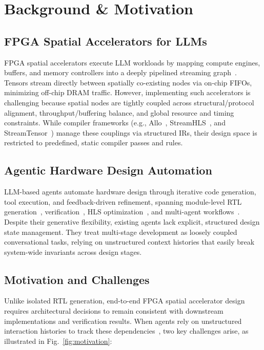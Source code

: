 \documentclass[9pt,conference]{IEEEtran}
\begin{document}
\section{Background \& Motivation}

\subsection{FPGA Spatial Accelerators for LLMs}
FPGA spatial accelerators execute LLM workloads by mapping compute engines, buffers, and memory controllers into a deeply pipelined streaming graph~\cite{streamtensor,allo,streamhls}. Tensors stream directly between spatially co-existing nodes via on-chip FIFOs, minimizing off-chip DRAM traffic. However, implementing such accelerators is challenging because spatial nodes are tightly coupled across structural/protocol alignment, throughput/buffering balance, and global resource and timing constraints. While compiler frameworks (e.g., Allo~\cite{allo}, StreamHLS~\cite{streamhls}, and StreamTensor~\cite{streamtensor}) manage these couplings via structured IRs, their design space is restricted to predefined, static compiler passes and rules.

\subsection{Agentic Hardware Design Automation}
LLM-based agents automate hardware design through iterative code generation, tool execution, and feedback-driven refinement, spanning module-level RTL generation~\cite{mage,rtlfixer}, verification~\cite{assertllm,correctbench}, HLS optimization~\cite{hlspilot}, and multi-agent workflows~\cite{mahl,gpt4aigchip,designconductor2,rtlsquad}. Despite their generative flexibility, existing agents lack explicit, structured design state management. They treat multi-stage development as loosely coupled conversational tasks, relying on unstructured context histories that easily break system-wide invariants across design stages.

\subsection{Motivation and Challenges}
Unlike isolated RTL generation, end-to-end FPGA spatial accelerator design requires architectural decisions to remain consistent with downstream implementations and verification results. When agents rely on unstructured interaction histories to track these dependencies~\cite{lostmiddle,longbench,locomo}, two key challenges arise, as illustrated in Fig.~\ref{fig:motivation}:
\end{document}
